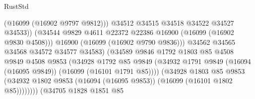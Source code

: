 \begin{lexlean}{RustStd}
\begin{coremodule}
                                              (@16099 (@16902 @9797 @9812)))
                                            @34512
                                            @34515
                                            @34518
                                            @34522
                                            @34527
                                            @34533))
                                        (@34544
                                          @9829
                                          @4611
                                          @22372
                                          @22386
                                          @16900
                                          (@16099 (@16902 @9830 @4508)))
                                        @16900
                                        (@16099 (@16902 @9790 @9836)))
                                      @34562
                                      @34565
                                      @34568
                                      @34572
                                      @34577
                                      @34583)
                                    (@34589
                                      @9846
                                      @1792
                                      @1803
                                      @85
                                      @4508
                                      @9849
                                      @4508
                                      @9853
                                      (@34928
                                        @1792
                                        @85
                                        @9849
                                        (@34932
                                          @1791
                                          @9849
                                          (@16094 (@16095 @9849))
                                          (@16099 (@16101 @1791 @85))))
                                      (@34928
                                        @1803
                                        @85
                                        @9853
                                        (@34932
                                          @1802
                                          @9853
                                          (@16094 (@16095 @9853))
                                          (@16099 (@16101 @1802 @85))))))))
                              (@34705
                                @1828
                                @1851
                                @85

\end{coremodule}
\end{lexlean}
